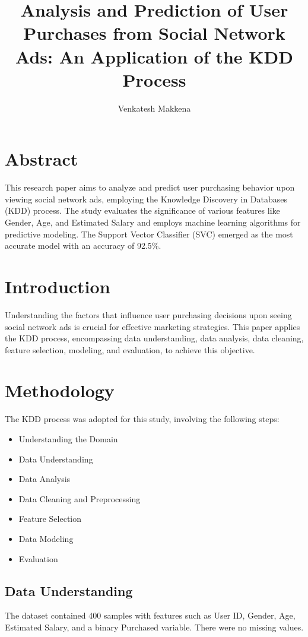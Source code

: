 \documentclass[12pt]{article}
\title{Analysis and Prediction of User Purchases from Social Network Ads: An Application of the KDD Process}
\author{Venkatesh Makkena}
\date{}
\begin{document}
\maketitle

\tableofcontents

\newpage
\section{Abstract}
This research paper aims to analyze and predict user purchasing behavior upon viewing social network ads, employing the Knowledge Discovery in Databases (KDD) process. The study evaluates the significance of various features like Gender, Age, and Estimated Salary and employs machine learning algorithms for predictive modeling. The Support Vector Classifier (SVC) emerged as the most accurate model with an accuracy of 92.5\%.

\section{Introduction}
Understanding the factors that influence user purchasing decisions upon seeing social network ads is crucial for effective marketing strategies. This paper applies the KDD process, encompassing data understanding, data analysis, data cleaning, feature selection, modeling, and evaluation, to achieve this objective.

\section{Methodology}
The KDD process was adopted for this study, involving the following steps:
\begin{itemize}
    \item Understanding the Domain
    \item Data Understanding
    \item Data Analysis
    \item Data Cleaning and Preprocessing
    \item Feature Selection
    \item Data Modeling
    \item Evaluation
\end{itemize}

\subsection{Data Understanding}
The dataset contained 400 samples with features such as User ID, Gender, Age, Estimated Salary, and a binary Purchased variable. There were no missing values.
\end{document}
